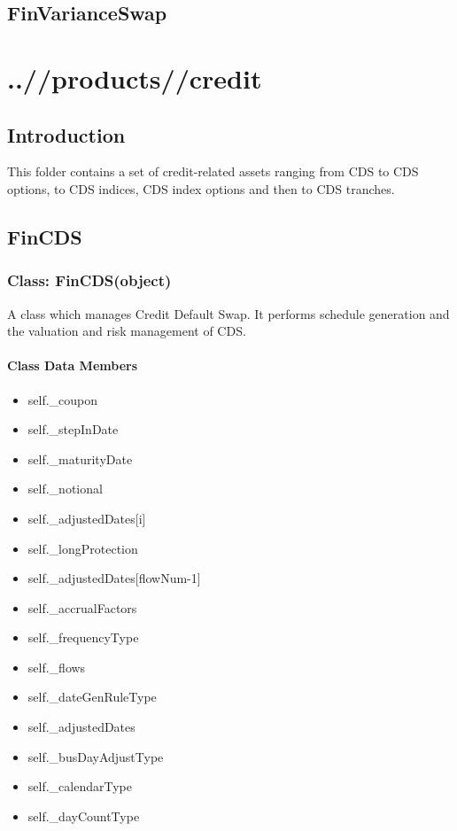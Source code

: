 \documentclass[twoside,11pt]{book}
\begin{document}
\newpage
\section{FinVarianceSwap}


\chapter{..//products//credit}
\section{Introduction}
This folder contains a set of credit-related assets ranging from CDS to CDS options, to CDS indices, CDS index options and then to CDS tranches. 
\newpage
\section{FinCDS}

\subsection{Class: FinCDS(object)}
A class which manages Credit Default Swap. It performs schedule generation and the valuation and risk management of CDS. 

\subsubsection{Class Data Members}
\begin{itemize}
\item{self.\_coupon}
\item{self.\_stepInDate}
\item{self.\_maturityDate}
\item{self.\_notional}
\item{self.\_adjustedDates[i]}
\item{self.\_longProtection}
\item{self.\_adjustedDates[flowNum-1]}
\item{self.\_accrualFactors}
\item{self.\_frequencyType}
\item{self.\_flows}
\item{self.\_dateGenRuleType}
\item{self.\_adjustedDates}
\item{self.\_busDayAdjustType}
\item{self.\_calendarType}
\item{self.\_dayCountType}
\end{itemize}
\end{document}
